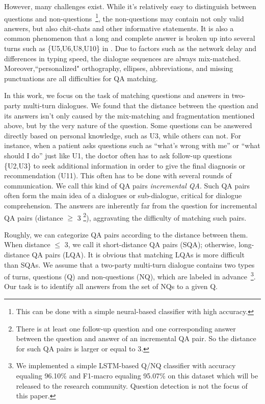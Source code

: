However, many challenges exist. While it's relatively easy to distinguish
between questions and non-questions~\footnote{This can be done with a simple 
neural-based classifier with high accuracy.},
the non-questions may contain not only valid answers, but also chit-chats and
other informative statements. It is also a common phenomenon that a long and complete answer is broken up into several turns such as \{U5,U6,U8,U10\} in . Due to factors such as the network delay and differences in typing speed, the dialogue sequences are always mix-matched. Moreover,``personalized" orthography, ellipses, abbreviations, and missing punctuations are all difficulties for QA matching.



In this work, we focus on the task of matching questions and answers in two-party 
multi-turn dialogues. We found that the distance between the question and its answers 
isn't only caused by the mix-matching and fragmentation mentioned above, 
but by the very nature of the question. 
Some questions can be answered directly based on personal knowledge, 
such as U3, while others can not. For instance, when a patient asks questions 
such as ``what's wrong with me'' or ``what should I do'' just like U1, the doctor often has to ask follow-up questions \{U2,U3\} to seek additional information in order to give the final diagnosis or recommendation (U11). This often has to be done with several rounds of communication. 
We call this kind of QA pairs {\em incremental QA}. 
Such QA pairs often form the main idea of a dialogues or sub-dialogue, 
critical for dialogue comprehension. The answers are inherently far from the question for incremental QA pairs (distance $\geq$ 3 \footnote{There is at least one follow-up question and one corresponding answer between the question and answer of an incremental QA pair. So the distance for such QA pairs is larger or equal to 3.}), aggravating the difficulty of matching such pairs. 

Roughly, we can categorize QA pairs according to the distance between them. 
When distance $\leq$ 3, we call it short-distance QA pairs (SQA); 
otherwise, long-distance QA pairs (LQA). 
It is obvious that matching LQAs is more difficult than SQAs. 
We assume that a two-party multi-turn dialogue contains two types of turns, 
questions (Q) and non-questions (NQ), 
which are labeled in advance~\footnote{We implemented a simple LSTM-based Q/NQ classifier
with accuracy equaling 96.10\% and F1-macro equaling 95.07\% on this dataset
which will be released to the research community.
Question detection is not the focus of this paper.}. 
Our task is to identify all answers from the set of NQs to a given Q. 

